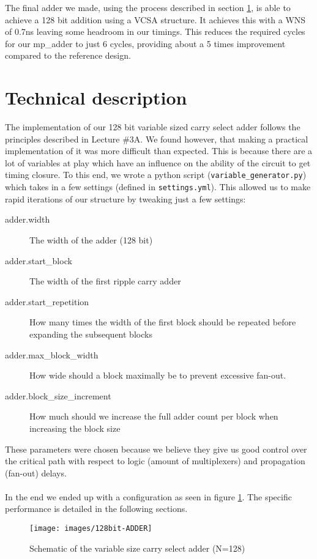 \documentclass[a4paper,kul]{kulakarticle} %
\begin{document}
The final adder we made, using the process described in section \ref{sec:tech_desc}, is able to achieve a 128 bit addition using a VCSA structure. It achieves this with a WNS of 0.7ns leaving some headroom in our timings. This reduces the required cycles for our mp\_adder to just 6 cycles, providing about a 5 times improvement compared to the reference design. 


\newpage
\section{Technical description}
\label{sec:tech_desc}


The implementation of our 128 bit variable sized carry select adder follows the principles described in Lecture \#3A. We found however, that making a practical implementation of it was more difficult than expected. This is because there are a lot of variables at play which have an influence on the ability of the circuit to get timing closure. To this end, we wrote a python script (\texttt{variable\_generator.py}) which takes in a few settings (defined in \texttt{settings.yml}). This allowed us to make rapid iterations of our structure by tweaking just a few settings:
\begin{description}
	\item[adder.width] The width of the adder (128 bit)
	\item[adder.start\_block] The width of the first ripple carry adder 
	\item[adder.start\_repetition] How many times the width of the first block should be repeated before expanding the subsequent blocks
	\item[adder.max\_block\_width] How wide should a block maximally be to prevent excessive fan-out. 
	\item[adder.block\_size\_increment] How much should we increase the full adder count per block when increasing the block size
\end{description}
These parameters were chosen because we believe they give us good control over the critical path with respect to logic (amount of multiplexers) and propagation (fan-out) delays. \\
\\
In the end we ended up with a configuration as seen in figure \ref{fig:128bit-adder}. The specific performance is detailed in the following sections. 
\begin{figure}[h]
	\centering
	\texttt{[image: images/128bit-ADDER]}
	\caption{Schematic of the variable size carry select adder (N=128)}
	\label{fig:128bit-adder}
\end{figure}
\end{document}
